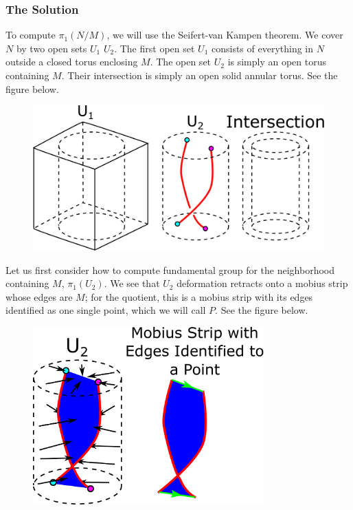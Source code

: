 \subsubsection*{The Solution}

To compute \(\pi_1(N / M)\), we will use the Seifert-van Kampen theorem. We cover \(N\) by two open sets \(U_1\)
\(U_2\). The first open set \(U_1\) consists of everything in \(N\) outside a closed torus enclosing \(M\). The
open set \(U_2\) is simply an open torus containing \(M\). Their intersection is simply an open solid annular torus.
See the figure below.  
\begin{figure}[h]
\centering
\includegraphics[width = 4.5in]{Topology/FundamentalGroupQuotient/split.pdf}
\end{figure}

Let us first consider how to compute fundamental group for the neighborhood containing \(M\), \(\pi_1(U_2)\). We
see that \(U_2\) deformation retracts onto a mobius strip whose edges are \(M\); for the quotient, this is a
mobius strip with its edges identified as one single point, which we will call \(P\). See the figure below.

\begin{figure}[h]
\centering
\includegraphics[width = 3.5in]{Topology/FundamentalGroupQuotient/deformationRetract.pdf}
\end{figure}


